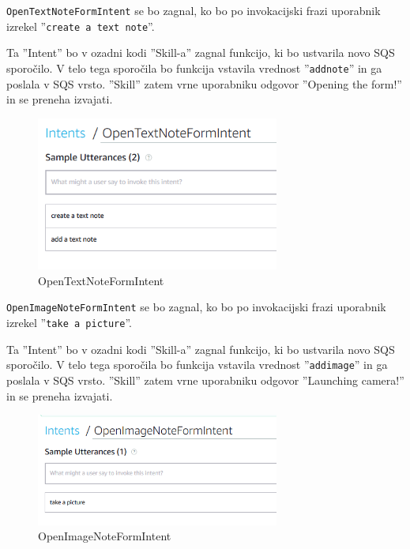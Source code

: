 \documentclass[a4paper, 12pt]{book}
\begin{document}
\texttt{OpenTextNoteFormIntent} se bo zagnal, ko bo po invokacijski frazi uporabnik izrekel ''\texttt{create a text note}''.

Ta ''Intent'' bo v ozadni kodi ''Skill-a'' zagnal funkcijo, ki bo ustvarila novo SQS sporočilo.
V telo tega sporočila bo funkcija vstavila vrednost ''\texttt{addnote}'' in ga poslala v SQS vrsto.
''Skill'' zatem vrne uporabniku odgovor ''Opening the form!'' in se preneha izvajati.


\begin{figure}[H]
\begin{center}
\includegraphics[width=8cm]{intent_text}
\end{center}
\caption{OpenTextNoteFormIntent}
\label{OpenTextNoteFormIntent}
\end{figure}

\texttt{OpenImageNoteFormIntent} se bo zagnal, ko bo po invokacijski frazi uporabnik izrekel ''\texttt{take a picture}''.

Ta ''Intent'' bo v ozadni kodi ''Skill-a'' zagnal funkcijo, ki bo ustvarila novo SQS sporočilo.
V telo tega sporočila bo funkcija vstavila vrednost ''\texttt{addimage}'' in ga poslala v SQS vrsto.
''Skill'' zatem vrne uporabniku odgovor ''Launching camera!'' in se preneha izvajati.

\begin{figure}[H]
\begin{center}
\includegraphics[width=8cm]{intent_image}
\end{center}
\caption{OpenImageNoteFormIntent}
\label{OpenImageNoteFormIntent}
\end{figure}
\end{document}
